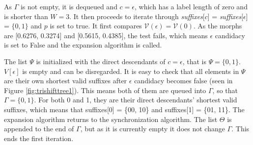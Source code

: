 {As $\Gamma$ is not empty, it is dequeued and $c = \epsilon$, which has a label length of zero and is shorter than $W = 3$. It then proceeds to iterate through \textit{suffixes}[$c$] = \textit{suffixes}[$\epsilon$] = $\{0, 1\}$ and $p$ is set to true. It first compares $\mathcal{V}(\epsilon) = \mathcal{V}(0)$. As the morphs are [0.6276, 0.3274] and [0.5615, 0.4385], the test fails, which means $\epsilon$ candidacy is set to False and the expansion algorithm is called. 

The list $\Psi$ is initialized with the direct descendants of $c = \epsilon$, that is $\Psi = \{0, 1\}$. $V[\epsilon]$ is empty and can be disregarded. It is easy to check that all elements in $\Psi$ are their own shortest valid suffixes after $\epsilon$ candidacy becomes false (seen in Figure \ref{fig:trishifttree1}). This means both of them are queued into $\Gamma$, so that $\Gamma = \{0, 1\}$. For both 0 and 1, they are their direct descendants' shortest valid suffixes, which means that suffixes[0] = \{00, 10\} and suffixes[1] = \{01, 11\}. The expansion algorithm returns to the synchronization algorithm. The list $\Theta$ is appended to the end of $\Gamma$, but as it is currently empty it does not change $\Gamma$. This ends the first iteration. 

}
